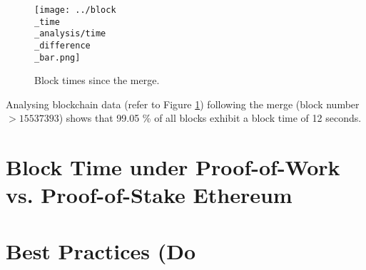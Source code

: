 \begin{figure}[H]
  \centering
  \texttt{[image: ../block\\\_time\\\_analysis/time\\\_difference\\\_bar.png]}
  \caption{Block times since the merge.}
  \label{fig:block_time_analysis}
\end{figure}

Analysing blockchain data (refer to Figure \ref{fig:block_time_analysis}) following the
merge (block number $> 15537393$) shows that 99.05 \% of all blocks exhibit a
block time of 12 seconds.


\section{Block Time under Proof-of-Work vs. Proof-of-Stake Ethereum}
\section{Best Practices (Do}
